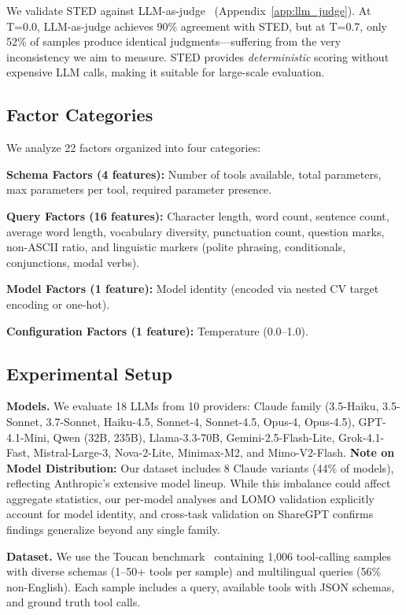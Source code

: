 \documentclass[sigconf,anonymous,review]{acmart}
\begin{document}
We validate STED against LLM-as-judge~\cite{zheng2024judging} (Appendix~\ref{app:llm_judge}). At T=0.0, LLM-as-judge achieves 90\% agreement with STED, but at T=0.7, only 52\% of samples produce identical judgments---suffering from the very inconsistency we aim to measure. STED provides \textit{deterministic} scoring without expensive LLM calls, making it suitable for large-scale evaluation.

\subsection{Factor Categories}

We analyze 22 factors organized into four categories:

\textbf{Schema Factors (4 features):} Number of tools available, total parameters, max parameters per tool, required parameter presence.

\textbf{Query Factors (16 features):} Character length, word count, sentence count, average word length, vocabulary diversity, punctuation count, question marks, non-ASCII ratio, and linguistic markers (polite phrasing, conditionals, conjunctions, modal verbs).

\textbf{Model Factors (1 feature):} Model identity (encoded via nested CV target encoding or one-hot).

\textbf{Configuration Factors (1 feature):} Temperature (0.0--1.0).

\subsection{Experimental Setup}

\textbf{Models.} We evaluate 18 LLMs from 10 providers: Claude family (3.5-Haiku, 3.5-Sonnet, 3.7-Sonnet, Haiku-4.5, Sonnet-4, Sonnet-4.5, Opus-4, Opus-4.5), GPT-4.1-Mini, Qwen (32B, 235B), Llama-3.3-70B, Gemini-2.5-Flash-Lite, Grok-4.1-Fast, Mistral-Large-3, Nova-2-Lite, Minimax-M2, and Mimo-V2-Flash. \textbf{Note on Model Distribution:} Our dataset includes 8 Claude variants (44\% of models), reflecting Anthropic's extensive model lineup. While this imbalance could affect aggregate statistics, our per-model analyses and LOMO validation explicitly account for model identity, and cross-task validation on ShareGPT confirms findings generalize beyond any single family.

\textbf{Dataset.} We use the Toucan benchmark~\cite{toucan2025} containing 1,006 tool-calling samples with diverse schemas (1--50+ tools per sample) and multilingual queries (56\% non-English). Each sample includes a query, available tools with JSON schemas, and ground truth tool calls.
\end{document}
